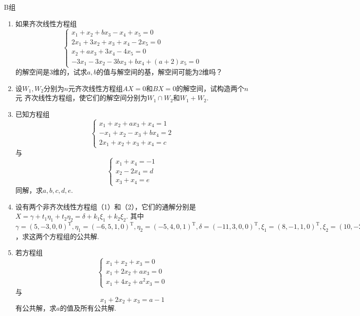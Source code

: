 \centerline{\heiti B组}
\begin{enumerate}
	\item 如果齐次线性方程组$$\begin{cases}
		x_1+x_2+bx_3-x_4+x_5=0 \\
		2x_1+3x_2+x_3+x_4-2x_5=0 \\
		x_2+ax_3+3x_4-4x_5=0 \\
		-3x_1-3x_2-3bx_3+bx_4+(a+2)x_5=0
	\end{cases}$$
	的解空间是3维的，试求$a,b$的值与解空间的基，解空间可能为2维吗？
	\item 设$W_1,W_2$分别为$n$元齐次线性方程组$AX=0$和$BX=0$的解空间，试构造两个$n$元
	齐次线性方程组，使它们的解空间分别为$W_1 \cap W_2$和$W_1+W_2$.
	\item 已知方程组$$\begin{cases}
		x_1+x_2+ax_3+x_4=1 \\ -x_1+x_2-x_3+bx_4=2 \\ 2x_1+x_2+x_3+x_4=c
	\end{cases}$$与$$\begin{cases}
		x_1+x_4=-1 \\ x_2-2x_4=d \\ x_3+x_4=e
	\end{cases}$$同解，求$a,b,c,d,e$.
	\item 设有两个非齐次线性方程组（1）和（2），它们的通解分别是$X=\gamma+t_1\eta_1+t_2\eta_2=\delta+k_1\xi_1+k_2\xi_2$.
	其中$\gamma=(5,-3,0,0)^\mathrm{T},\eta_1=(-6,5,1,0)^\mathrm{T},\eta_2=(-5,4,0,1)^\mathrm{T},
	\delta=(-11,3,0,0)^\mathrm{T},\xi_1=(8,-1,1,0)^\mathrm{T},\xi_2=(10,-2,0,1)^\mathrm{T}$，求这两个方程组的公共解.
	\item 若方程组$$\begin{cases}
		x_1+x_2+x_3=0 \\ x_1+2x_2+ax_3=0 \\ x_1+4x_2+a^2x_3=0
	\end{cases}$$与$$x_1+2x_2+x_3=a-1$$有公共解，求$a$的值及所有公共解.
\end{enumerate}

